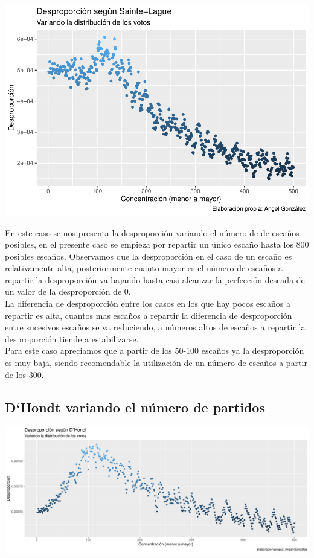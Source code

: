 \documentclass[12pt,a4paper,]{book}
\numberwithin{dummy}{section}
\theoremstyle{ocrenumbox}
\theoremstyle{blacknumex}
\theoremstyle{blacknumbox}
\theoremstyle{ocrenum}
\theoremstyle{ocrenum}
\begin{document}
\begin{center}\includegraphics[width=0.95\linewidth]{figurasR/unnamed-chunk-13-1} \end{center}

En este caso se nos presenta la desproporción variando el número de de
escaños posibles, en el presente caso se empieza por repartir un único
escaño hasta los 800 posibles escaños. Observamos que la desproporción
en el caso de un escaño es relativamente alta, posteriormente cuanto
mayor es el número de escaños a repartir la desproporción va bajando
hasta casi alcanzar la perfección deseada de un valor de la
desproporción de 0.\\
La diferencia de desproporción entre los casos en los que hay pocos
escaños a repartir es alta, cuantos mas escaños a repartir la diferencia
de desproporción entre sucesivos escaños se va reduciendo, a números
altos de escaños a repartir la desproporción tiende a estabilizarse.\\
Para este caso apreciamos que a partir de los 50-100 escaños ya la
desproporción es muy baja, siendo recomendable la utilización de un
número de escaños a partir de los 300.

\hypertarget{dhondt-variando-el-nuxfamero-de-partidos}{%
\subsection{D`Hondt variando el número de
partidos}\label{dhondt-variando-el-nuxfamero-de-partidos}}

\begin{center}\includegraphics[width=0.95\linewidth]{figurasR/unnamed-chunk-14-1} \end{center}
\end{document}
